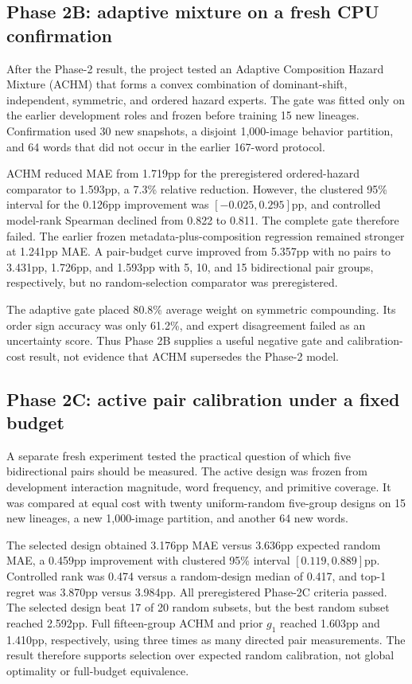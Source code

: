 \documentclass[11pt,a4paper]{article}
\begin{document}
\subsection{Phase 2B: adaptive mixture on a fresh CPU confirmation}

After the Phase-2 result, the project tested an Adaptive Composition Hazard
Mixture (ACHM) that forms a convex combination of dominant-shift, independent,
symmetric, and ordered hazard experts.  The gate was fitted only on the earlier
development roles and frozen before training 15 new lineages.  Confirmation
used 30 new snapshots, a disjoint 1,000-image behavior partition, and 64 words
that did not occur in the earlier 167-word protocol.

ACHM reduced MAE from 1.719pp for the preregistered ordered-hazard comparator
to 1.593pp, a 7.3\% relative reduction.  However, the clustered 95\% interval
for the 0.126pp improvement was $[-0.025,0.295]$pp, and controlled model-rank
Spearman declined from 0.822 to 0.811.  The complete gate therefore failed.
The earlier frozen metadata-plus-composition regression remained stronger at
1.241pp MAE.  A pair-budget curve improved from 5.357pp with no pairs to
3.431pp, 1.726pp, and 1.593pp with 5, 10, and 15 bidirectional pair groups,
respectively, but no random-selection comparator was preregistered.

The adaptive gate placed 80.8\% average weight on symmetric compounding.  Its
order sign accuracy was only 61.2\%, and expert disagreement failed as an
uncertainty score.  Thus Phase 2B supplies a useful negative gate and
calibration-cost result, not evidence that ACHM supersedes the Phase-2 model.

\subsection{Phase 2C: active pair calibration under a fixed budget}

A separate fresh experiment tested the practical question of which five
bidirectional pairs should be measured.  The active design was frozen from
development interaction magnitude, word frequency, and primitive coverage.
It was compared at equal cost with twenty uniform-random five-group designs on
15 new lineages, a new 1,000-image partition, and another 64 new words.

The selected design obtained 3.176pp MAE versus 3.636pp expected random MAE,
a 0.459pp improvement with clustered 95\% interval $[0.119,0.889]$pp.
Controlled rank was 0.474 versus a random-design median of 0.417, and top-1
regret was 3.870pp versus 3.984pp.  All preregistered Phase-2C criteria passed.
The selected design beat 17 of 20 random subsets, but the best random subset
reached 2.592pp.  Full fifteen-group ACHM and prior $g_1$ reached 1.603pp and
1.410pp, respectively, using three times as many directed pair measurements.
The result therefore supports selection over expected random calibration, not
global optimality or full-budget equivalence.
\end{document}
